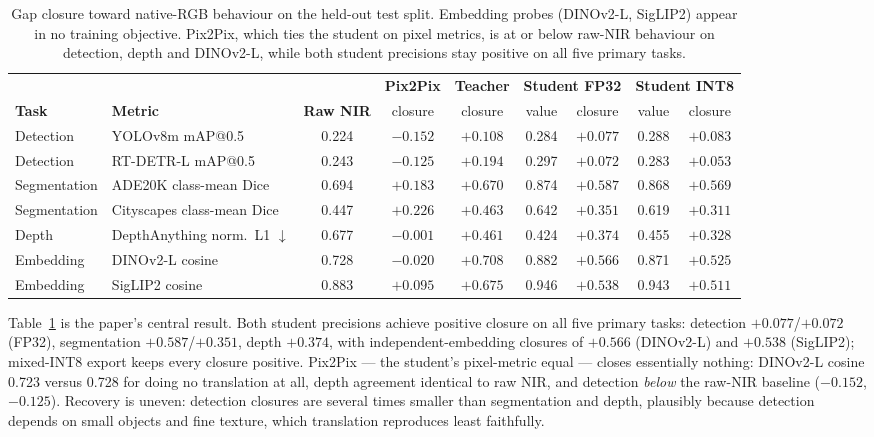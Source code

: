 \documentclass[10pt,twocolumn,letterpaper]{article}
\begin{document}
\begin{table}[t]
\centering
\footnotesize
\setlength{\tabcolsep}{4.5pt}
\begin{tabular}{llccccccc}
\toprule
& & & \textbf{Pix2Pix} & \textbf{Teacher} & \multicolumn{2}{c}{\textbf{Student FP32}} & \multicolumn{2}{c}{\textbf{Student INT8}} \\
\cmidrule(lr){6-7}\cmidrule(lr){8-9}
\textbf{Task} & \textbf{Metric} & \textbf{Raw NIR} & closure & closure & value & closure & value & closure \\
\midrule
Detection & YOLOv8m mAP@0.5 & 0.224 & $-0.152$ & $+0.108$ & 0.284 & $+0.077$ & 0.288 & $+0.083$ \\
Detection & RT-DETR-L mAP@0.5 & 0.243 & $-0.125$ & $+0.194$ & 0.297 & $+0.072$ & 0.283 & $+0.053$ \\
Segmentation & ADE20K class-mean Dice & 0.694 & $+0.183$ & $+0.670$ & 0.874 & $+0.587$ & 0.868 & $+0.569$ \\
Segmentation & Cityscapes class-mean Dice & 0.447 & $+0.226$ & $+0.463$ & 0.642 & $+0.351$ & 0.619 & $+0.311$ \\
Depth & DepthAnything norm.\ L1 $\downarrow$ & 0.677 & $-0.001$ & $+0.461$ & 0.424 & $+0.374$ & 0.455 & $+0.328$ \\
\midrule
Embedding & DINOv2-L cosine & 0.728 & $-0.020$ & $+0.708$ & 0.882 & $+0.566$ & 0.871 & $+0.525$ \\
Embedding & SigLIP2 cosine & 0.883 & $+0.095$ & $+0.675$ & 0.946 & $+0.538$ & 0.943 & $+0.511$ \\
\bottomrule
\end{tabular}
\caption{Gap closure toward native-RGB behaviour on the held-out test split. Embedding probes (DINOv2-L, SigLIP2) appear in no training objective. Pix2Pix, which ties the student on pixel metrics, is at or below raw-NIR behaviour on detection, depth and DINOv2-L, while both student precisions stay positive on all five primary tasks.}
\label{tab:closure}
\end{table}

Table~\ref{tab:closure} is the paper's central result. Both student precisions achieve positive closure on all five primary tasks: detection $+0.077$/$+0.072$ (FP32), segmentation $+0.587$/$+0.351$, depth $+0.374$, with independent-embedding closures of $+0.566$ (DINOv2-L) and $+0.538$ (SigLIP2); mixed-INT8 export keeps every closure positive. Pix2Pix --- the student's pixel-metric equal --- closes essentially nothing: DINOv2-L cosine 0.723 versus 0.728 for doing no translation at all, depth agreement identical to raw NIR, and detection \emph{below} the raw-NIR baseline ($-0.152$, $-0.125$). Recovery is uneven: detection closures are several times smaller than segmentation and depth, plausibly because detection depends on small objects and fine texture, which translation reproduces least faithfully.
\end{document}
